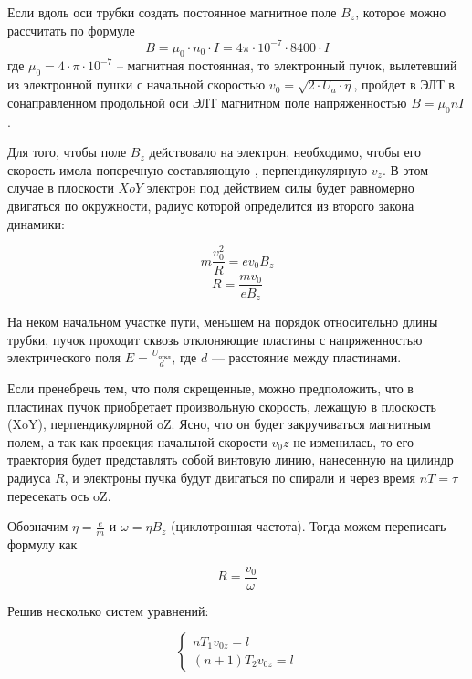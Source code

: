 Если вдоль оси трубки создать постоянное магнитное поле $B_z$, которое можно рассчитать по формуле
\begin{equation}
	B=\mu_0\cdot{}n_0\cdot{}I=4\pi\cdot10^{-7}\cdot8400\cdot{}I
\end{equation}
где $\mu_0=4\cdot\pi\cdot10^{-7}$ -- магнитная постоянная, то электронный пучок, вылетевший из электронной пушки с начальной скоростью $v_0=\sqrt{2\cdot{U_a}\cdot\eta}$, пройдет в ЭЛТ в сонаправленном продольной оси ЭЛТ магнитном поле напряженностью $B=\mu_0nI$. 

Для того, чтобы поле $B_z$ действовало на электрон, необходимо, чтобы его скорость имела поперечную составляющую , перпендикулярную $v_z$. В этом случае в плоскости $XoY$ электрон под действием силы  будет равномерно двигаться по окружности, радиус которой определится из второго закона динамики:

\begin{equation}
	m\frac{v_0^2}{R}=ev_0B_z
\end{equation}
\begin{equation}
	R=\frac{mv_0}{eB_z}
\end{equation}

На неком начальном участке пути, меньшем на порядок относительно длины трубки, пучок проходит сквозь отклоняющие пластины с напряженностью электрического поля $E=\frac{U_\text{откл}}{d}$, где $d$ --- расстояние между пластинами.

Если пренебречь тем, что поля скрещенные, можно предположить, что в пластинах пучок приобретает произвольную скорость, лежащую в плоскость (XoY), перпендикулярной oZ. Ясно, что он будет закручиваться магнитным полем, а так как проекция начальной скорости $v_0z$ не изменилась, то
его траектория будет представлять собой винтовую линию, нанесенную на цилиндр радиуса $R$, и электроны пучка будут двигаться по спирали и через время $nT=\tau$ пересекать ось oZ.

Обозначим $\eta=\frac{e}{m}$ и $\omega=\eta{}B_z$ (циклотронная частота). Тогда можем переписать формулу как

\begin{equation}
	R=\frac{v_0}{\omega}
\end{equation}

Решив несколько систем уравнений:

\begin{equation}
	\begin{cases}
		nT_1v_{0z}=l\\
		(n+1)T_2v_{0z}=l
	\end{cases}	
\end{equation}

